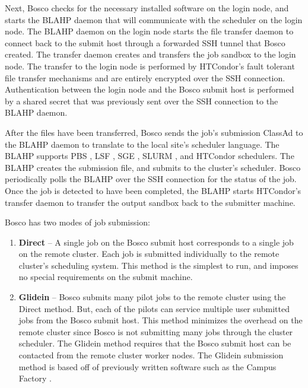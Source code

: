 

Next, Bosco checks for the necessary installed software on the login node, and starts the BLAHP \cite{blahp} daemon that will communicate with the scheduler on the login node.  The BLAHP daemon on the login node starts the file transfer daemon to connect back to the submit host through a forwarded SSH tunnel that Bosco created.  The transfer daemon creates and transfers the job sandbox to the login node.  The transfer to the login node is performed by HTCondor's fault tolerant file transfer mechanisms and are entirely encrypted over the SSH connection.  Authentication between the login node and the Bosco submit host is performed by a shared secret that was previously sent over the SSH connection to the BLAHP daemon.

After the files have been transferred, Bosco sends the job's submission ClassAd \cite{raman1998matchmaking} to the BLAHP daemon to translate to the local site's scheduler language.  The BLAHP supports PBS \cite{computing2013torque}, LSF \cite{computinglsf}, SGE \cite{gentzsch2001sun}, SLURM \cite{yoo2003slurm}, and HTCondor schedulers.  The BLAHP creates the submission file, and submits to the cluster's scheduler.  Bosco periodically polls the BLAHP over the SSH connection for the status of the job.  Once the job is detected to have been completed, the BLAHP starts HTCondor's transfer daemon to transfer the output sandbox back to the submitter machine.

Bosco has two modes of job submission:
\begin{enumerate}
	\item \textbf{Direct} -- A single job on the Bosco submit host corresponds to a single job on the remote cluster.  Each job is submitted individually to the remote cluster's scheduling system.  This method is the simplest to run, and imposes no special requirements on the submit machine.
	\item \textbf{Glidein} -- Bosco submits many pilot jobs to the remote cluster using the Direct method.  But, each of the pilots can service multiple user submitted jobs from the Bosco submit host.  This method minimizes the overhead on the remote cluster since Bosco is not submitting many jobs through the cluster scheduler.  The Glidein method requires that the Bosco submit host can be contacted from the remote cluster worker nodes. \label{sec:glidein}  The Glidein submission method is based off of previously written software such as the Campus Factory \cite{weitzel2011campus}.
\end{enumerate}


